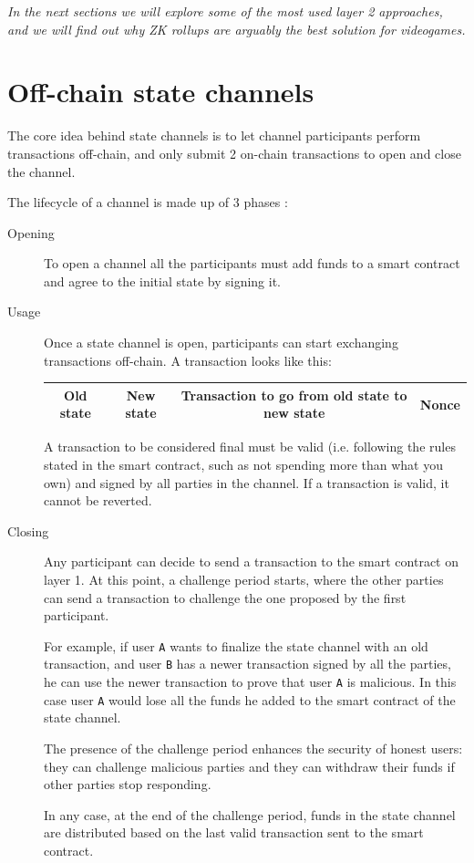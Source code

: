 \documentclass[12pt]{article}
\begin{document}
\emph{In the next sections we will explore some of the most used layer 2 approaches, and we will find out why ZK rollups are arguably the best solution for videogames.}

\section{Off-chain state channels} \label{section:ocsc}
The core idea behind state channels is to let channel participants perform transactions off-chain, and only submit 2 on-chain transactions to open and close the channel.

The lifecycle of a channel is made up of 3 phases \cite{ethereum_state_channels}:
\begin{description}
    \item[Opening] To open a channel all the participants must add funds to a smart contract and agree to the initial state by signing it.
    \item[Usage] Once a state channel is open, participants can start exchanging transactions off-chain. A transaction looks like this:
        \begin{table}[ht]
            \centering
            \begin{tabular}{|c|c|c|c|}
                \hline
                Old state & New state & Transaction to go from old state to new state & Nonce \\
                \hline
            \end{tabular}
            \label{table:state_channel_transaction}
        \end{table}

        A transaction to be considered final must be valid (i.e. following the rules stated in the smart contract, such as not spending more than what you own) and signed by all parties in the channel.
        If a transaction is valid, it cannot be reverted.
    \item[Closing] Any participant can decide to send a transaction to the smart contract on layer 1. At this point, a challenge period starts, where the other parties can send a transaction to challenge the one proposed by the first participant.
    
                    For example, if user \verb|A| wants to finalize the state channel with an old transaction, and user \verb|B| has a newer transaction signed by all the parties, he can use the newer transaction to prove that user \verb|A| is malicious.
                    In this case user \verb|A| would lose all the funds he added to the smart contract of the state channel.

                    The presence of the challenge period enhances the security of honest users: they can challenge malicious parties and they can withdraw their funds if other parties stop responding.

                    In any case, at the end of the challenge period, funds in the state channel are distributed based on the last valid transaction sent to the smart contract.
\end{description}
\end{document}
